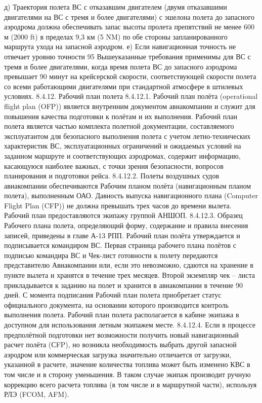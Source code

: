 д)	Траектория полета ВС с отказавшим двигателем (двумя отказавшими двигателями на ВС с тремя и более двигателями) с эшелона полета до запасного аэродрома должна обеспечивать запас высоты пролета препятствий не менее 600 м (2000 ft) в пределах 9,3 км (5 NM) по обе стороны запланированного маршрута ухода на запасной аэродром.
е)	Если навигационная точность не отвечает уровню точности 95%
Вышеуказанные требования применимы для ВС с тремя и более двигателями, когда время полета ВС до запасного аэродрома превышает 90 минут на крейсерской скорости, соответствующей скорости полета со всеми работающими двигателями при стандартной атмосфере в штилевых условиях.
8.4.12. Рабочий план полета
8.4.12.1. Рабочий план полёта (operational flight plan (OFP)) является внутренним документом авиакомпании и служит для повышения качества подготовки к полётам и их выполнения.
Рабочий план полета является частью комплекта полетной документации, составляемого эксплуатантом для безопасного выполнения полета с учетом летно-технических характеристик ВС, эксплуатационных ограничений и ожидаемых условий на заданном маршруте и соответствующих аэродромах, содержит информацию, касающуюся наиболее важных, с точки зрения безопасности, вопросов планирования и подготовки рейса.
8.4.12.2. Полеты воздушных судов авиакомпании обеспечиваются Рабочим планом полёта (навигационным планом полета), выполненным ОАО. Давность выпуска навигационного плана (Computer Flight Plan (CFP)) не должна превышать трех часов до времени вылета. Рабочий план предоставляются экипажу группой АНШОП. 
8.4.12.3. Образец Рабочего плана полета, определяющий форму, содержание и правила внесения записей, приведены в главе А-13 РПП. Рабочий план полёта утверждается и подписывается командиром ВС. 
Первая страница рабочего плана полётов с подписью командира ВС и Чек-лист готовности к полету передаются представителю Авиакомпании или, если это невозможно, сдаются на хранение в пункте вылета и хранятся в течение трех месяцев. Второй экземпляр чек – листа прикладывается к заданию на полет и хранится в авиакомпании в течение 90 дней. С момента подписания Рабочий план полета приобретает статус официального документа, на основании которого производится контроль выполнения полета. Рабочий план полета располагается в кабине экипажа в доступном для использования летным экипажем месте.
8.4.12.4. Если в процессе предполётной подготовки нет возможности получить новый навигационный расчет полёта (СFP), но возникла необходимость выбрать другой запасной аэродром или коммерческая загрузка значительно отличается от загрузки, указанной в расчете, значение количества топлива может быть изменено КВС в том числе и в сторону уменьшения. В таком случае экипаж производит ручную коррекцию всего расчета топлива (в том числе и в маршрутной части), используя РЛЭ (FCOM, AFM). 
